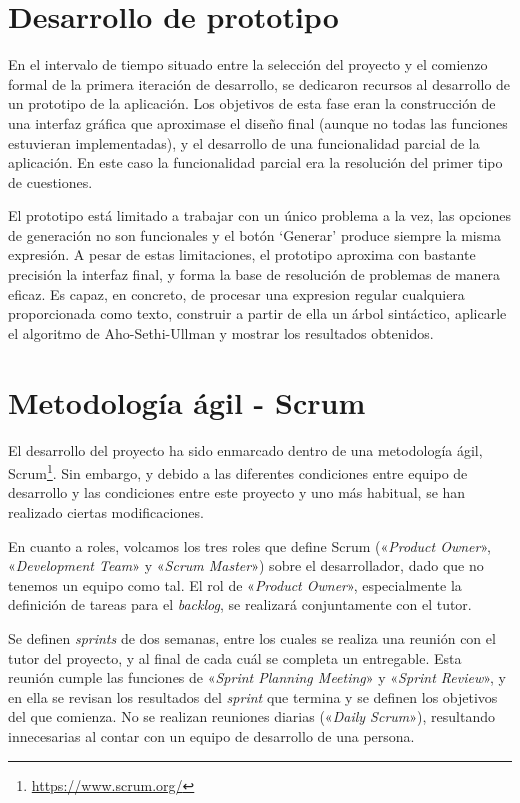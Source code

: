 
\section{Desarrollo de prototipo}
En el intervalo de tiempo situado entre la selección del proyecto y el comienzo formal de la primera iteración de desarrollo, se dedicaron recursos al desarrollo de un prototipo de la aplicación.
Los objetivos de esta fase eran la construcción de una interfaz gráfica que aproximase el diseño final (aunque no todas las funciones estuvieran implementadas), y el desarrollo de una funcionalidad parcial de la aplicación.
En este caso la funcionalidad parcial era la resolución del primer tipo de cuestiones.


El prototipo está limitado a trabajar con un único problema a la vez, las opciones de generación no son funcionales y el botón `Generar' produce siempre la misma expresión.
A pesar de estas limitaciones, el prototipo aproxima con bastante precisión la interfaz final, y forma la base de resolución de problemas de manera eficaz.
Es capaz, en concreto, de procesar una expresion regular cualquiera proporcionada como texto, construir a partir de ella un árbol sintáctico, aplicarle el algoritmo de Aho-Sethi-Ullman y mostrar los resultados obtenidos.

\section{Metodología ágil - Scrum}
El desarrollo del proyecto ha sido enmarcado dentro de una metodología ágil, Scrum\footnote{\url{https://www.scrum.org/}}.
Sin embargo, y debido a las diferentes condiciones entre equipo de desarrollo y las condiciones entre este proyecto y uno más habitual, se han realizado ciertas modificaciones.

En cuanto a roles, volcamos los tres roles que define Scrum («\emph{Product Owner}», «\emph{Development Team}» y «\emph{Scrum Master}») sobre el desarrollador, dado que no tenemos un equipo como tal.
El rol de «\emph{Product Owner}», especialmente la definición de tareas para el \emph{backlog}, se realizará conjuntamente con el tutor.

Se definen \emph{sprints} de dos semanas, entre los cuales se realiza una reunión con el tutor del proyecto, y al final de cada cuál se completa un entregable.
Esta reunión cumple las funciones de «\emph{Sprint Planning Meeting}» y «\emph{Sprint Review}», y en ella se revisan los resultados del \emph{sprint} que termina y se definen los objetivos del que comienza.
No se realizan reuniones diarias («\emph{Daily Scrum}»), resultando innecesarias al contar con un equipo de desarrollo de una persona.

